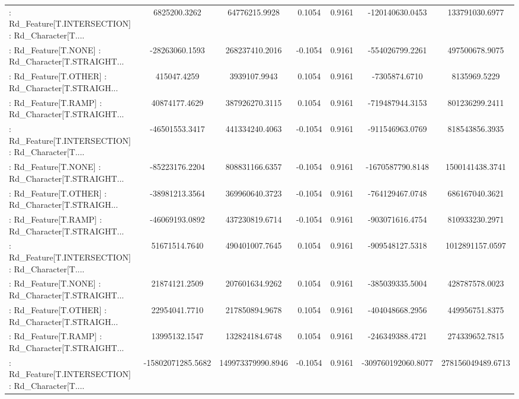 \begin{longtable}{p{4cm}cccccc}
 : Rd\_Feature[T.INTERSECTION] : Rd\_Character[T.... &      6825200.3262 &     64776215.9928 &  0.1054 &       0.9161 &    -120140630.0453 &    133791030.6977 \\
 : Rd\_Feature[T.NONE] : Rd\_Character[T.STRAIGHT... &    -28263060.1593 &    268237410.2016 & -0.1054 &       0.9161 &    -554026799.2261 &    497500678.9075 \\
 : Rd\_Feature[T.OTHER] : Rd\_Character[T.STRAIGH... &       415047.4259 &      3939107.9943 &  0.1054 &       0.9161 &      -7305874.6710 &      8135969.5229 \\
 : Rd\_Feature[T.RAMP] : Rd\_Character[T.STRAIGHT... &     40874177.4629 &    387926270.3115 &  0.1054 &       0.9161 &    -719487944.3153 &    801236299.2411 \\
 : Rd\_Feature[T.INTERSECTION] : Rd\_Character[T.... &    -46501553.3417 &    441334240.4063 & -0.1054 &       0.9161 &    -911546963.0769 &    818543856.3935 \\
 : Rd\_Feature[T.NONE] : Rd\_Character[T.STRAIGHT... &    -85223176.2204 &    808831166.6357 & -0.1054 &       0.9161 &   -1670587790.8148 &   1500141438.3741 \\
 : Rd\_Feature[T.OTHER] : Rd\_Character[T.STRAIGH... &    -38981213.3564 &    369960640.3723 & -0.1054 &       0.9161 &    -764129467.0748 &    686167040.3621 \\
 : Rd\_Feature[T.RAMP] : Rd\_Character[T.STRAIGHT... &    -46069193.0892 &    437230819.6714 & -0.1054 &       0.9161 &    -903071616.4754 &    810933230.2971 \\
 : Rd\_Feature[T.INTERSECTION] : Rd\_Character[T.... &     51671514.7640 &    490401007.7645 &  0.1054 &       0.9161 &    -909548127.5318 &   1012891157.0597 \\
 : Rd\_Feature[T.NONE] : Rd\_Character[T.STRAIGHT... &     21874121.2509 &    207601634.9262 &  0.1054 &       0.9161 &    -385039335.5004 &    428787578.0023 \\
 : Rd\_Feature[T.OTHER] : Rd\_Character[T.STRAIGH... &     22954041.7710 &    217850894.9678 &  0.1054 &       0.9161 &    -404048668.2956 &    449956751.8375 \\
 : Rd\_Feature[T.RAMP] : Rd\_Character[T.STRAIGHT... &     13995132.1547 &    132824184.6748 &  0.1054 &       0.9161 &    -246349388.4721 &    274339652.7815 \\
 : Rd\_Feature[T.INTERSECTION] : Rd\_Character[T.... & -15802071285.5682 & 149973379990.8946 & -0.1054 &       0.9161 & -309760192060.8077 & 278156049489.6713 \\

\end{longtable}
